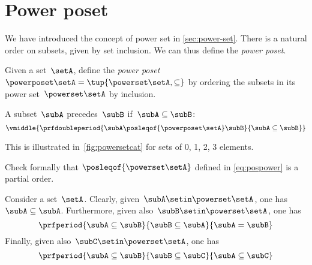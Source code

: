 \section{Power poset}

We have introduced the concept of power set in \cref{sec:power-set}.
There is a natural order on subsets, given by set inclusion.
We can thus define the \emph{power poset}.

\begin{definition}
    \label{def:power-poset}
    Given a set~$\setA$,
    define the \emph{power poset}~$\powerposet\setA = \tup{\powerset\setA,\subseteq}$ by ordering the subsets in its power set~$\powerset\setA$ by inclusion.

    A subset~$\subA$ precedes~$\subB$ if~$\subA \subseteq \subB$:
    \begin{equation}\label{eq:pospower}
        \vmiddle{
            \prfdoubleperiod{
                \subA \posleqof{\powerposet\setA} \subB
            }{
                \subA \subseteq \subB
            }
        }
    \end{equation}
\end{definition}
This is illustrated in~\cref{fig:powersetcat} for sets of 0, 1, 2, 3 elements.
\begin{exercise}
    Check formally that $\posleqof{\powerset\setA}$ defined in \cref{eq:pospower} is a partial order.
\end{exercise}
\begin{solution}
    Consider a set~$\setA$.
    Clearly, given~$\subA\setin \powerset \setA$, one has~$\subA\subseteq \subA$.
    Furthermore, given also~$\subB\setin \powerset \setA$, one has
    \begin{equation*}
        \prfperiod{\subA\subseteq \subB}{\subB\subseteq \subA}{\subA=\subB}
    \end{equation*}
    Finally, given also~$\subC\setin \powerset \setA$, one has
    \begin{equation*}
        \prfperiod{\subA\subseteq \subB}{\subB\subseteq \subC}{\subA\subseteq\subC}
    \end{equation*}
\end{solution}
\vfill
\begin{figure*}[h]
    \centering
    \hfill
    \hfill
    \hfill
    \caption{Power set as a poset.
    }
    \label{fig:powersetcat}
\end{figure*}
\vfill
